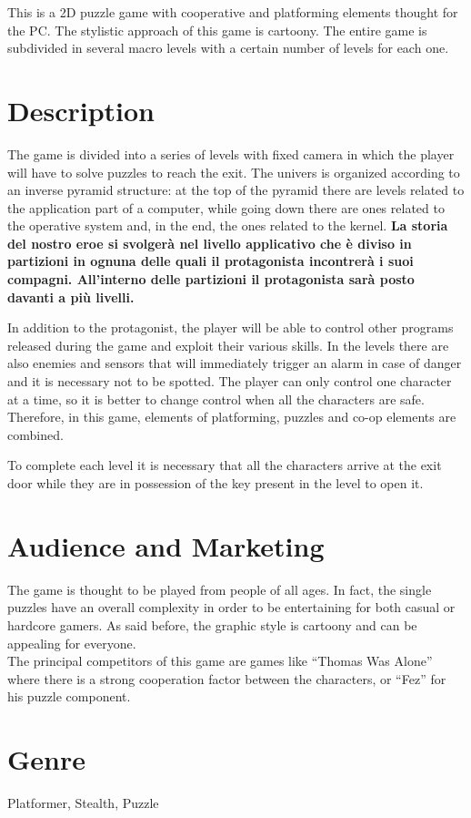 \documentclass[12pt, a4paper]{report}
\begin{document}
This is a 2D puzzle game with cooperative and platforming elements thought for the PC. The stylistic approach of this game is cartoony. The entire game is subdivided in several macro levels with a certain number of levels for each one.

\section*{Description}
The game is divided into a series of levels with fixed camera in which the player will have to solve puzzles to reach the exit. The univers is organized according to an inverse pyramid structure: at the top of the pyramid there are levels related to the application part of a computer, while going down there are ones related to the operative system and, in the end, the ones related to the kernel. \textbf{La storia del nostro eroe si svolgerà nel livello applicativo che è diviso in partizioni in ognuna delle quali il protagonista incontrerà i suoi compagni. All'interno delle partizioni il protagonista sarà posto davanti a più livelli.}

In addition to the protagonist, the player will be able to control other programs released during the game and exploit their various skills. In the levels there are also enemies and sensors that will immediately trigger an alarm in case of danger and it is necessary not to be spotted. The player can only control one character at a time, so it is better to change control when all the characters are safe. Therefore, in this game, elements of platforming, puzzles and co-op elements are combined.

To complete each level it is necessary that all the characters arrive at the exit door while they are in possession of the key present in the level to open it.

\section*{Audience and Marketing}
The game is thought to be played from people of all ages. In fact, the single puzzles have an overall complexity in order to be entertaining for both casual or hardcore gamers. As said before, the graphic style is cartoony and can be appealing for everyone.\\
The principal competitors of this game are games like “Thomas Was Alone” where there is a strong cooperation factor between the characters, or “Fez” for his puzzle component.

\section*{Genre}
Platformer, Stealth, Puzzle
\end{document}
